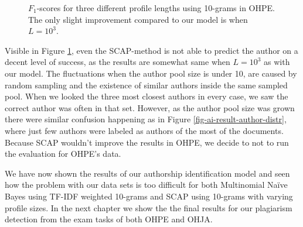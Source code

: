 \begin{figure}[ht] 
    \setlength\figureheight{6cm}
    \setlength\figurewidth{\textwidth}
    
    \caption{$F_1$-scores for three different profile lengths using 10-grams in OHPE. The only slight improvement compared to our model is when $L=10^3$.}
    \label{fig-scap-ohpe-f1}
\end{figure}

\noindent
Visible in Figure \ref{fig-scap-ohpe-f1}, even the SCAP-method is not able to predict the author on a decent level of success, as the results are somewhat same when $L=10^3$ as with our model. The fluctuations when the author pool size is under 10, are caused by random sampling and the existence of similar authors inside the same sampled pool. When we looked the three most closest authors in every case, we saw the correct author was often in that set. However, as the author pool size was grown there were similar confusion happening as in Figure \ref{fig-ai-result-author-distr}, where just few authors were labeled as authors of the most of the documents. Because SCAP wouldn't improve the results in OHPE, we decide to not to run the evaluation for OHPE's data.   

We have now shown the results of our authorship identification model and seen how the problem with our data sets is too difficult for both Multinomial Naïve Bayes using TF-IDF weighted 10-grams and SCAP using 10-grams with varying profile sizes. In the next chapter we show the the final results for our plagiarism detection from the exam tasks of both OHPE and OHJA.



